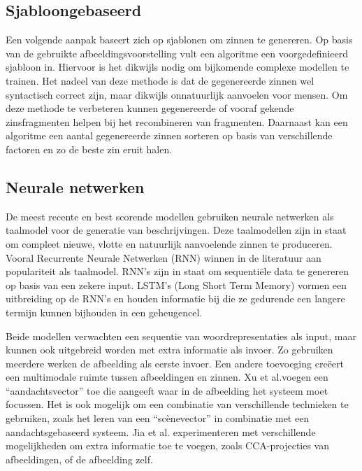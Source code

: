 \subsection{Sjabloongebaseerd}
Een volgende aanpak baseert zich op sjablonen om zinnen te genereren. Op basis van de gebruikte afbeeldingsvoorstelling vult een algoritme een voorgedefinieerd sjabloon in\cite{Yang2011}. Hiervoor is het dikwijls nodig om bijkomende complexe modellen te trainen\cite{Elliott2013}. Het nadeel van deze methode is dat de gegenereerde zinnen wel syntactisch correct zijn, maar dikwijls onnatuurlijk aanvoelen voor mensen. Om deze methode te verbeteren kunnen gegenereerde of vooraf gekende zinsfragmenten helpen bij het recombineren van fragmenten\cite{Mitchell2012,Kuznetsova2012}. Daarnaast kan een algoritme een aantal gegenereerde zinnen sorteren op basis van verschillende factoren en zo de beste zin eruit halen. 

\subsection{Neurale netwerken}
De meest recente en best scorende modellen gebruiken neurale netwerken als taalmodel voor de generatie van beschrijvingen. Deze taalmodellen zijn in staat om compleet nieuwe, vlotte en natuurlijk aanvoelende zinnen te produceren. Vooral Recurrente Neurale Netwerken (RNN)\cite{Mikolov2010} winnen in de literatuur aan populariteit als taalmodel. RNN's zijn in staat om sequenti\"ele data te genereren op basis van een zekere input. LSTM's (Long Short Term Memory)\cite{SeppHochreiter1997} vormen een uitbreiding op de RNN's en houden informatie bij die ze gedurende een langere termijn kunnen bijhouden in een geheugencel. 

Beide modellen verwachten een sequentie van woordrepresentaties als input, maar kunnen ook uitgebreid worden met extra informatie als invoer. Zo gebruiken meerdere werken de afbeelding als eerste invoer. Een andere toevoeging cre\"eert een multimodale ruimte tussen afbeeldingen en zinnen\cite{Kiros2014,Socher2014}. Xu et al.\cite{Xu2015}voegen een ``aandachtsvector'' toe die aangeeft waar in de afbeelding het systeem moet focussen. Het is ook mogelijk om een combinatie van verschillende technieken te gebruiken, zoals het leren van een ``sc\`enevector'' in combinatie met een aandachtsgebaseerd systeem\cite{Jin2015}. Jia et al. experimenteren met verschillende mogelijkheden om extra informatie toe te voegen, zoals CCA-projecties van afbeeldingen, of de afbeelding zelf\cite{Fernando2015}.

